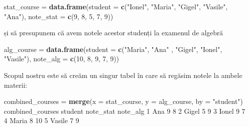\documentclass[]{article}
\newenvironment{Shaded}{\begin{snugshade}}{\end{snugshade}}
\newcommand{\DataTypeTok}[1]{\textcolor[rgb]{0.13,0.29,0.53}{#1}}
\newcommand{\DecValTok}[1]{\textcolor[rgb]{0.00,0.00,0.81}{#1}}
\newcommand{\KeywordTok}[1]{\textcolor[rgb]{0.13,0.29,0.53}{\textbf{#1}}}
\newcommand{\NormalTok}[1]{#1}
\newcommand{\StringTok}[1]{\textcolor[rgb]{0.31,0.60,0.02}{#1}}
\begin{document}
\begin{Shaded}
\begin{Highlighting}[]
\NormalTok{stat_course =}\StringTok{ }\KeywordTok{data.frame}\NormalTok{(}\DataTypeTok{student =} \KeywordTok{c}\NormalTok{(}\StringTok{"Ionel"}\NormalTok{, }\StringTok{"Maria"}\NormalTok{, }\StringTok{"Gigel"}\NormalTok{, }\StringTok{"Vasile"}\NormalTok{, }\StringTok{"Ana"}\NormalTok{),}
                         \DataTypeTok{note_stat =} \KeywordTok{c}\NormalTok{(}\DecValTok{9}\NormalTok{, }\DecValTok{8}\NormalTok{, }\DecValTok{5}\NormalTok{, }\DecValTok{7}\NormalTok{, }\DecValTok{9}\NormalTok{)) }
\end{Highlighting}
\end{Shaded}

și să presupunem că avem notele acestor studenți la examenul de algebră

\begin{Shaded}
\begin{Highlighting}[]
\NormalTok{alg_course =}\StringTok{ }\KeywordTok{data.frame}\NormalTok{(}\DataTypeTok{student =} \KeywordTok{c}\NormalTok{(}\StringTok{"Maria"}\NormalTok{, }\StringTok{"Ana"}\NormalTok{ , }\StringTok{"Gigel"}\NormalTok{, }\StringTok{"Ionel"}\NormalTok{, }\StringTok{"Vasile"}\NormalTok{),}
                         \DataTypeTok{note_alg =} \KeywordTok{c}\NormalTok{(}\DecValTok{10}\NormalTok{, }\DecValTok{8}\NormalTok{, }\DecValTok{9}\NormalTok{, }\DecValTok{7}\NormalTok{, }\DecValTok{9}\NormalTok{)) }
\end{Highlighting}
\end{Shaded}

Scopul nostru este să creăm un singur tabel în care să regăsim notele la
ambele materii:

\begin{Shaded}
\begin{Highlighting}[]
\NormalTok{combined_courses =}\StringTok{ }\KeywordTok{merge}\NormalTok{(}\DataTypeTok{x =}\NormalTok{ stat_course, }
                         \DataTypeTok{y =}\NormalTok{ alg_course,}
                         \DataTypeTok{by =} \StringTok{"student"}\NormalTok{)}
\NormalTok{combined_courses}
\NormalTok{  student note_stat note_alg}
\DecValTok{1}\NormalTok{     Ana         }\DecValTok{9}        \DecValTok{8}
\DecValTok{2}\NormalTok{   Gigel         }\DecValTok{5}        \DecValTok{9}
\DecValTok{3}\NormalTok{   Ionel         }\DecValTok{9}        \DecValTok{7}
\DecValTok{4}\NormalTok{   Maria         }\DecValTok{8}       \DecValTok{10}
\DecValTok{5}\NormalTok{  Vasile         }\DecValTok{7}        \DecValTok{9}
\end{Highlighting}
\end{Shaded}
\end{document}
